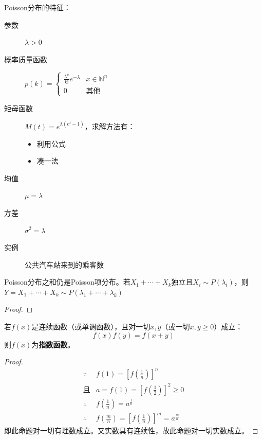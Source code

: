 Poisson分布的特征：
\begin{description}
    \item[参数] $\lambda>0$
    \item[概率质量函数] $p(k)=\begin{cases}
                \frac{\lambda^{k}}{k !}e^{-\lambda} & x \in \mathbb{N}^n \\
                0                                   & \text{其他}
            \end{cases}$
    \item[矩母函数] $M(t)=e^{\lambda (e^t -1)}$，求解方法有：
        \begin{itemize}
            \item 利用公式
            \item 凑一法
        \end{itemize}
    \item[均值] $\mu=\lambda$
    \item[方差] $\sigma^2=\lambda$
    \item[实例] 公共汽车站来到的乘客数
\end{description}

\begin{proposition}
    Poisson分布之和仍是Poisson项分布。若$X_1+\cdots+X_k$独立且$X_i \sim P(\lambda_i)$，则$Y=X_1+\cdots+X_k  \sim P(\lambda_1+\cdots+\lambda_k)$
\end{proposition}

\begin{proof}
\end{proof}

\begin{lemma}\label{lem:Cauchy_lemma}
    若$f(x)$是连续函数（或单调函数），且对一切$x,y$（或一切$x,y\ge 0$）成立：
    \[ f(x)f(y)=f(x+y) \]
    则$f(x)$为\textbf{指数函数}。
\end{lemma}

\begin{proof}
    \begin{align*}
        \because   & f(1)=[f(\frac{1}{n})]^n                           \\
        \text{且}  & a=f(1)=[f(\frac{1}{2})]^2\ge 0                    \\
        \therefore & f(\frac{1}{n})=a^{\frac{1}{n}}                    \\
        \therefore & f(\frac{m}{n})=[f(\frac{1}{n})]^m=a^{\frac{m}{n}}
    \end{align*}
    即此命题对一切有理数成立。又实数具有连续性，故此命题对一切实数成立。
\end{proof}

